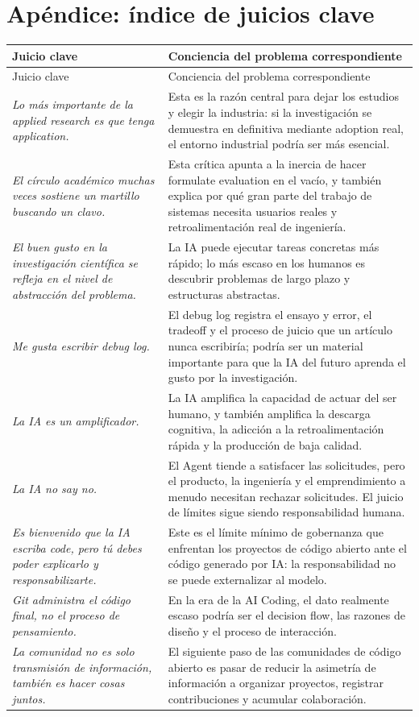 \documentclass[a4paper]{article}
\begin{document}
\section*{Apéndice: índice de juicios clave}

\begin{longtable}{>{\raggedright\arraybackslash}p{} >{\raggedright\arraybackslash}p{}}
\toprule
Juicio clave & Conciencia del problema correspondiente \\
\midrule
\endfirsthead
\toprule
Juicio clave & Conciencia del problema correspondiente \\
\midrule
\endhead
\textit{Lo más importante de la applied research es que tenga application.} & Esta es la razón central para dejar los estudios y elegir la industria: si la investigación se demuestra en definitiva mediante adoption real, el entorno industrial podría ser más esencial. \\
\textit{El círculo académico muchas veces sostiene un martillo buscando un clavo.} & Esta crítica apunta a la inercia de hacer formulate evaluation en el vacío, y también explica por qué gran parte del trabajo de sistemas necesita usuarios reales y retroalimentación real de ingeniería. \\
\textit{El buen gusto en la investigación científica se refleja en el nivel de abstracción del problema.} & La IA puede ejecutar tareas concretas más rápido; lo más escaso en los humanos es descubrir problemas de largo plazo y estructuras abstractas. \\
\textit{Me gusta escribir debug log.} & El debug log registra el ensayo y error, el tradeoff y el proceso de juicio que un artículo nunca escribiría; podría ser un material importante para que la IA del futuro aprenda el gusto por la investigación. \\
\textit{La IA es un amplificador.} & La IA amplifica la capacidad de actuar del ser humano, y también amplifica la descarga cognitiva, la adicción a la retroalimentación rápida y la producción de baja calidad. \\
\textit{La IA no say no.} & El Agent tiende a satisfacer las solicitudes, pero el producto, la ingeniería y el emprendimiento a menudo necesitan rechazar solicitudes. El juicio de límites sigue siendo responsabilidad humana. \\
\textit{Es bienvenido que la IA escriba code, pero tú debes poder explicarlo y responsabilizarte.} & Este es el límite mínimo de gobernanza que enfrentan los proyectos de código abierto ante el código generado por IA: la responsabilidad no se puede externalizar al modelo. \\
\textit{Git administra el código final, no el proceso de pensamiento.} & En la era de la AI Coding, el dato realmente escaso podría ser el decision flow, las razones de diseño y el proceso de interacción. \\
\textit{La comunidad no es solo transmisión de información, también es hacer cosas juntos.} & El siguiente paso de las comunidades de código abierto es pasar de reducir la asimetría de información a organizar proyectos, registrar contribuciones y acumular colaboración. \\
\bottomrule
\end{longtable}
\end{document}

